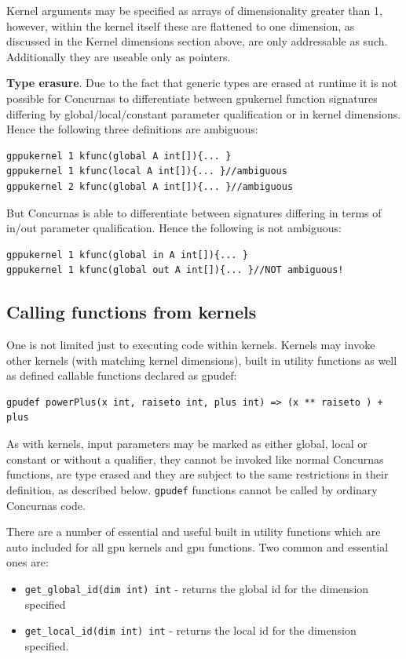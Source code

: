 \documentclass[conc-doc]{subfiles}
\begin{document}
Kernel arguments may be specified as arrays of dimensionality greater than 1, however, within the kernel itself these are flattened to one dimension, as discussed in the Kernel dimensions section above, are only addressable as such. Additionally they are useable only as pointers.

\textbf{Type erasure}. Due to the fact that generic types are erased at runtime it is not possible for Concurnas to differentiate between gpukernel function signatures differing by global/local/constant parameter qualification or in kernel dimensions. Hence the following three definitions are ambiguous:
\begin{lstlisting}
gppukernel 1 kfunc(global A int[]){... }
gppukernel 1 kfunc(local A int[]){... }//ambiguous
gppukernel 2 kfunc(global A int[]){... }//ambiguous
\end{lstlisting}

But Concurnas is able to differentiate between signatures differing in terms of in/out parameter qualification. Hence the following is not ambiguous:
\begin{lstlisting}
gppukernel 1 kfunc(global in A int[]){... }
gppukernel 1 kfunc(global out A int[]){... }//NOT ambiguous!
\end{lstlisting}

\subsection{Calling functions from kernels}
One is not limited just to executing code within kernels. Kernels may invoke other kernels (with matching kernel dimensions), built in utility functions as well as defined callable functions declared as gpudef:

\begin{lstlisting}
gpudef powerPlus(x int, raiseto int, plus int) => (x ** raiseto ) + plus 
\end{lstlisting}

As with kernels, input parameters may be marked as either global, local or constant or without a qualifier, they cannot be invoked like normal Concurnas functions, are type erased and they are subject to the same restrictions in their definition, as described below. \lstinline{gpudef} functions cannot be called by ordinary Concurnas code.

There are a number of essential and useful built in utility functions which are auto included for all gpu kernels and gpu functions. Two common and essential ones are:
\begin{itemize}
	\item \lstinline{get_global_id(dim int) int} - returns the global id for the dimension specified
	\item \lstinline{get_local_id(dim int) int} - returns the local id for the dimension specified.
\end{itemize}
\end{document}
